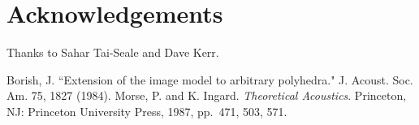 \documentclass{aes137}
\begin{document}
\section{Acknowledgements}
Thanks to Sahar Tai-Seale and Dave Kerr.

%
%

\begin{thebibliography}{99}

Borish, J. ``Extension of the image model to arbitrary polyhedra." J. Acoust. Soc. Am. 75, 1827 (1984).
Morse, P. and K. Ingard. \emph{Theoretical Acoustics}. Princeton, NJ: Princeton University Press, 1987, pp.~471, 503, 571.

%
%
%
\end{thebibliography}
\end{document}
